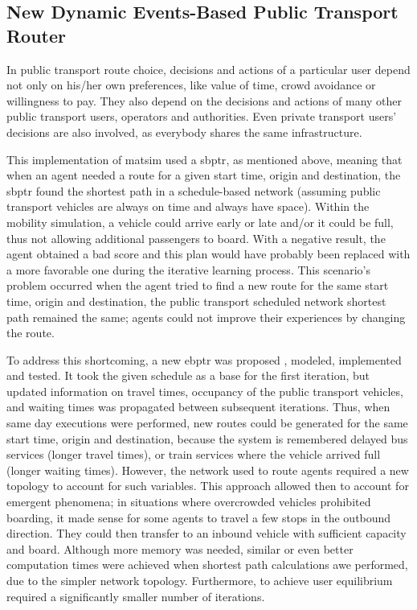 \subsection{New Dynamic Events-Based Public Transport Router}
In public transport route choice, decisions and actions of a particular user depend not only on his/her own preferences, like value of time, crowd avoidance or willingness to pay. They also depend on the decisions and actions of many other public transport users, operators and authorities. Even private transport users' decisions are also involved, as everybody shares the same infrastructure.

This implementation of \gls{matsim} used a \gls{sbptr}, as mentioned above, meaning that when an agent needed a route for a given start time, origin and destination, the \gls{sbptr} found the shortest path in a schedule-based network (assuming public transport vehicles are always on time and always have space). Within the mobility simulation, a vehicle could arrive early or late and/or it could be full, thus not allowing additional passengers to board. With a negative result, the agent obtained a bad score and this plan would have probably been replaced with a more favorable one during the iterative learning process. This scenario's problem occurred when the agent tried to find a new route for the same start time, origin and destination, the public transport scheduled network shortest path remained the same; agents could not improve their experiences by changing the route.

To address this shortcoming, a new \gls{ebptr} was proposed \citep[][]{OrdonezErath_TechRep_FCL_2013}, modeled, implemented and tested. It took the given schedule as a base for the first iteration, but updated information on travel times, occupancy of the public transport vehicles, and waiting times was propagated between subsequent iterations. Thus, when same day executions were performed, new routes could be generated for the same start time, origin and destination, because the system is remembered delayed bus services (longer travel times), or train services where the vehicle arrived full (longer waiting times). However, the network used to route agents required a new topology to account for such variables. This approach allowed then to account for emergent phenomena; in situations where overcrowded vehicles prohibited boarding, it made sense for some agents to travel a few stops in the outbound direction. They could then transfer to an inbound vehicle with sufficient capacity and board. Although more memory was needed, similar or even better computation times were achieved when shortest path calculations awe performed, due to the simpler network topology. Furthermore, to achieve user equilibrium required a significantly smaller number of iterations.

